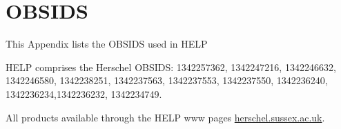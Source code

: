\documentclass[usenatbib]{mnras}
\begin{document}





\section{OBSIDS}

This Appendix lists the OBSIDS used in HELP

HELP comprises the  Herschel OBSIDS: 1342257362, 1342247216,
1342246632, 1342246580, 1342238251, 1342237563, 1342237553, 1342237550,
1342236240, 1342236234,1342236232, 1342234749.

All products available through the HELP www pages \url{herschel.sussex.ac.uk}.



\end{document}

